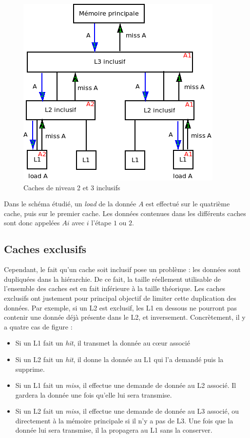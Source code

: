 \begin{figure}[H]
\begin{center}
   \includegraphics[scale=0.7]{images/inclusifs.png}
   \caption{\label{img:cache_inclusifs} Caches de niveau 2 et 3 inclusifs}
\end{center}
\end{figure}

Dans le schéma étudié, un \emph{load} de la donnée $A$ est effectué sur le quatrième cache, puis sur le premier cache. Les données contenues dans les différents caches sont donc appelées $Ai$ avec $i$ l'étape $1$ ou $2$.

\subsection{Caches exclusifs}
Cependant, le fait qu'un cache soit inclusif pose un problème : les données sont dupliquées dans la hiérarchie. De ce fait, la taille réellement utilisable de l'ensemble des caches est en fait inférieure à la taille théorique. Les caches exclusifs ont justement pour principal objectif de limiter cette duplication des données. Par exemple, si un L2 est exclusif, les L1 en dessous ne pourront pas contenir une donnée déjà présente dans le L2, et inversement. Concrètement, il y a quatre cas de figure : \\

\begin{itemize}
\item Si un L1 fait un \textit{hit}, il transmet la donnée au c{\oe}ur associé
\item Si un L2 fait un \textit{hit}, il donne la donnée au L1 qui l'a demandé puis la supprime.
\item Si un L1 fait un \textit{miss}, il effectue une demande de donnée au L2 associé. Il gardera la donnée une fois qu'elle lui sera transmise.
\item Si un L2 fait un \textit{miss}, il effectue une demande de donnée au L3 associé, ou directement à la mémoire principale si il n'y a pas de L3. Une fois que la donnée lui sera transmise, il la propagera au L1 sans la conserver. \\
\end{itemize}

